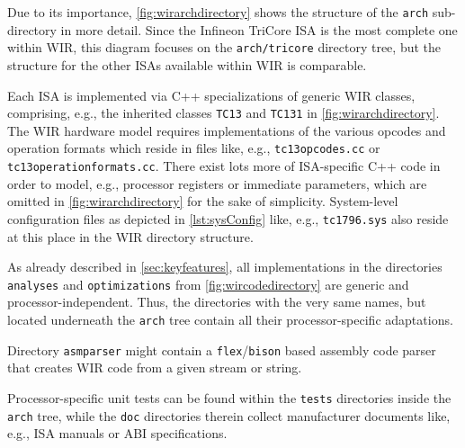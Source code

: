 Due to its importance, \cref{fig:wirarchdirectory} shows the structure of the \texttt{arch} sub-directory in more detail.
Since the Infineon TriCore \gls{ISA} is the most complete one within \gls{WIR}, this diagram focuses on the \texttt{arch/tricore} directory tree, but the structure for the other \glspl{ISA} available within \gls{WIR} is comparable.

Each \gls{ISA} is implemented via C++ specializations of generic \gls{WIR} classes, comprising, e.g., the inherited classes \texttt{TC13} and \texttt{TC131} in \cref{fig:wirarchdirectory}.
The \gls{WIR} hardware model requires implementations of the various opcodes and operation formats which reside in files like, e.g., \texttt{tc13opcodes.cc} or \texttt{tc13operationformats.cc}.
There exist lots more of \gls{ISA}-specific C++ code in order to model, e.g., processor registers or immediate parameters, which are omitted in \cref{fig:wirarchdirectory} for the sake of simplicity.
System-level configuration files as depicted in \cref{lst:sysConfig} like, e.g., \texttt{tc1796.sys} also reside at this place in the \gls{WIR} directory structure.

As already described in \cref{sec:keyfeatures}, all implementations in the directories \texttt{analyses} and \texttt{optimizations} from \cref{fig:wircodedirectory} are generic and processor-independent.
Thus, the directories with the very same names, but located underneath the \texttt{arch} tree contain all their processor-specific adaptations.

Directory \texttt{asmparser} might contain a \texttt{flex}/\texttt{bison} based assembly code parser that creates \gls{WIR} code from a given stream or string.

Processor-specific unit tests can be found within the \texttt{tests} directories inside the \texttt{arch} tree, while the \texttt{doc} directories therein collect manufacturer documents like, e.g., \gls{ISA} manuals or \gls{ABI} specifications.

\cleardoubleoddpage
